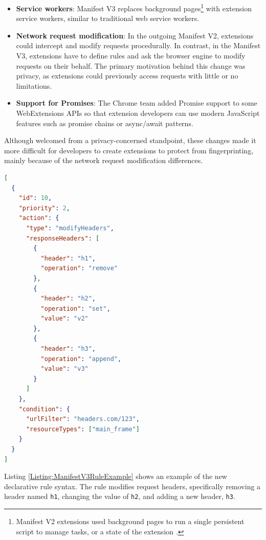 \begin{itemize}
	\item \textbf{Service workers}: Manifest V3 replaces background pages\footnote{Manifest V2 extensions used background pages to run a single persistent script to manage tasks, or a state of the extension \cite{ChromeManifestV2}.} with extension service workers, similar to traditional web service workers.
	\item \textbf{Network request modification}: In the outgoing Manifest V2, extensions could intercept and modify requests procedurally. In contrast, in the Manifest V3, extensions have to define rules and ask the browser engine to modify requests on their behalf. The primary motivation behind this change was privacy, as extensions could previously access requests with little or no limitations.
	\item \textbf{Support for Promises}: The Chrome team added Promise support to some WebExtensions APIs so that extension developers can use modern JavaScript features such as promise chains or async/await patterns.
\end{itemize}

Although welcomed from a privacy-concerned standpoint, these changes made it more difficult for developers to create extensions to protect from fingerprinting, mainly because of the network request modification differences.

\bigbreak

\begin{lstlisting}[language={JSON},caption={An example of a declarative rule which modifies selected response headers \cite{ChromeWebExtensions}.}, label={Listing:ManifestV3RuleExample}]
[
  {
    "id": 10,
    "priority": 2,
    "action": {
      "type": "modifyHeaders",
      "responseHeaders": [
        {
          "header": "h1",
          "operation": "remove"
        },
        {
          "header": "h2",
          "operation": "set",
          "value": "v2"
        },
        {
          "header": "h3",
          "operation": "append",
          "value": "v3"
        }
      ]
    },
    "condition": {
      "urlFilter": "headers.com/123",
      "resourceTypes": ["main_frame"]
    }
  }
]
\end{lstlisting}

\medbreak

Listing \ref{Listing:ManifestV3RuleExample} shows an example of the new declarative rule syntax. The rule modifies request headers, specifically removing a header named \texttt{h1}, changing the value of \texttt{h2}, and adding a new header, \texttt{h3}.

